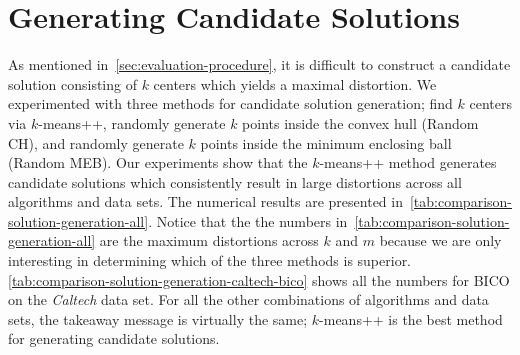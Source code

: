 





\section{Generating Candidate Solutions}
\label{sec:candidate-solution-generation}
As mentioned in~\cref{sec:evaluation-procedure}, it is difficult to construct a candidate solution consisting of $k$ centers which yields a maximal distortion. We experimented with three methods for candidate solution generation; find $k$ centers via $k$-means++, randomly generate $k$ points inside the convex hull (Random CH), and randomly generate $k$ points inside the minimum enclosing ball (Random MEB). Our experiments show that the $k$-means++ method generates candidate solutions which consistently result in large distortions across all algorithms and data sets. The numerical results are presented in~\cref{tab:comparison-solution-generation-all}. Notice that the the numbers in~\cref{tab:comparison-solution-generation-all} are the maximum distortions across $k$ and $m$ because
we are only interesting in determining which of the three methods is superior. \cref{tab:comparison-solution-generation-caltech-bico} shows all the numbers for BICO on the \textit{Caltech} data set. For all the other combinations of algorithms and data sets, the takeaway message is virtually the same; $k$-means++ is the best method for generating candidate solutions.




